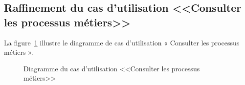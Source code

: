 \subsection{Raffinement du cas d'utilisation <<Consulter les processus métiers>>}
La figure~\ref{fig:cpmet} illustre le diagramme de cas d'utilisation « Consulter les processus métiers ».
\begin{figure}[h]
     \centering
     \caption{Diagramme du cas d'utilisation <<Consulter les processus métiers>>}
     \label{fig:cpmet}
\end{figure}\\
\newpage
